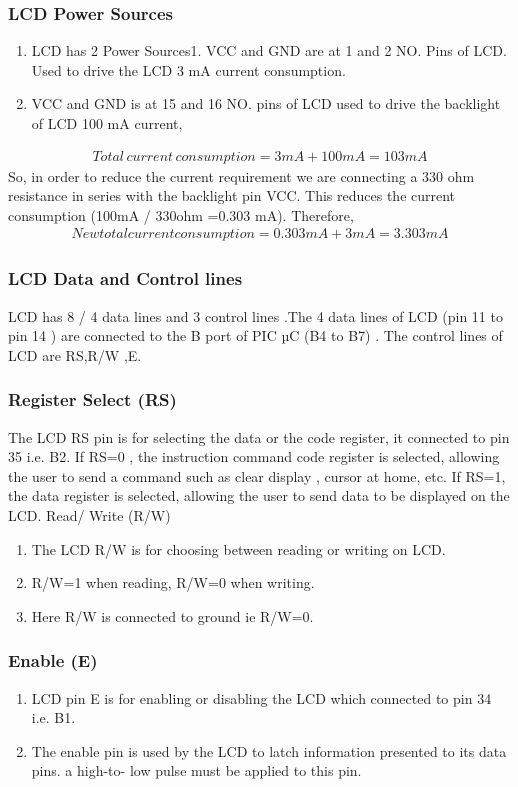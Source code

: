 \documentclass[12pt,a4paper,oneside,openright]{report}
\begin{document}
\subsubsection{LCD Power Sources}
\begin{enumerate}
 \item LCD has 2 Power Sources1. VCC and GND are at 1 and 2 NO. Pins of LCD. Used to drive the LCD 3 mA current consumption.
\item VCC and GND is at 15 and 16 NO. pins of LCD used to drive the backlight of LCD  100 mA current,
\end{enumerate}
\begin{align}
Total\, current\, consumption = 3mA + 100mA = 103 mA 
\end{align}
So, in order to reduce the current requirement we are connecting a 330 ohm resistance in series with the backlight pin VCC. This reduces the current consumption (100mA / 330ohm =0.303 mA).
Therefore,
\begin{align}
New total current consumption = 0.303mA+3 mA =3.303 mA 
\end{align}
\subsubsection{LCD Data and Control lines}
LCD has 8  / 4 data lines and 3 control lines .The 4 data lines of LCD (pin 11 to pin 14 ) are connected to the B port of PIC µC (B4 to B7) . The control lines of LCD are RS,R/W ,E. 
\subsubsection{Register Select (RS)}
The LCD RS pin is for selecting the data or the code register, it connected to pin 35 i.e. B2. If RS=0 , the instruction command code register is selected, allowing the user to send a command such as clear display , cursor at home, etc. If RS=1, the data register is selected, allowing the user to send data to be displayed on the LCD.
Read/ Write (R/W)
\begin{enumerate}
 \item The LCD R/W is for choosing between reading or writing on LCD. 
\item R/W=1 when reading, R/W=0 when writing.
\item Here R/W is connected to ground ie R/W=0.
\end{enumerate}

\subsubsection{Enable (E)}
\begin{enumerate}
 \item LCD pin E is for enabling or disabling the LCD which connected to pin 34 i.e. B1.
\item The enable pin is used by the LCD to latch information presented to its data pins. a high-to- low pulse must be applied to this pin.
\end{enumerate}
\end{document}
